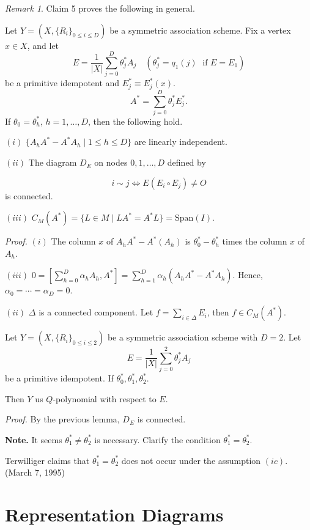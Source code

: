 \documentclass[
]{book}
\theoremstyle{definition}
\theoremstyle{definition}
\theoremstyle{definition}
\theoremstyle{definition}
\theoremstyle{remark}
\newtheorem*{remark}{Remark}
\begin{document}
\begin{remark}
Claim 5 proves the following in general.

Let \(Y = (X, \{R_i\}_{0\leq i\leq D})\) be a symmetric association scheme. Fix a vertex \(x\in X\), and let
\[E = \frac{1}{|X|}\sum_{j=0}^D \theta^*_j A_j \quad (\theta^*_j = q_1(j) \; \text{ if $E = E_1$})\]
be a primitive idempotent and \(E^*_j\equiv E^*_j(x)\).
\[A^* = \sum_{j=0}^D \theta_j^*E^*_j.\]
If \(\theta_0 = \theta^*_h\), \(h=1, \ldots, D\), then the following hold.

\((i)\) \(\{A_hA^* - A^*A_h \mid 1\leq h\leq D\}\) are linearly independent.

\((ii)\) The diagram \(D_E\) on nodes \(0, 1, \ldots, D\) defined by

\[i\sim j \Leftrightarrow E(E_i\circ E_j)\neq O\]
is connected.

\((iii)\) \(C_M(A^*) = \{L\in M\mid LA^* = A^*L\} = \mathrm{Span}(I).\)

\emph{Proof.}
\textbar{} \((i)\) The column \(x\) of \(A_hA^* - A^*(A_h)\) is \(\theta^*_0-\theta^*_h\) times the column \(x\) of \(A_h\).

\((iii)\) \({\displaystyle 0 = [\sum_{h=0}^D\alpha_hA_h, A^*] = \sum_{h=1}^D\alpha_h(A_hA^*-A^*A_h)}\). Hence, \(\alpha_0 = \cdots =\alpha_D = 0\).

\((ii)\) \(\Delta\) is a connected component. Let \(f = \sum_{i\in \Delta}E_i\), then \(f\in C_M(A^*)\).

Let \(Y = (X, \{R_i\}_{0\leq i\leq 2})\) be a symmetric association scheme with \(D = 2\). Let
\[E = \frac{1}{|X|}\sum_{j=0}^2\theta^*_j A_j\]
be a primitive idempotent. If \(\theta^*_0, \theta_1^*, \theta^*_2\).

Then \(Y\) us \(Q\)-polynomial with respect to \(E\).

\emph{Proof.}
By the previous lemma, \(D_E\) is connected.

\textbf{Note.}
It seems \(\theta^*_1 \neq \theta^*_2\) is necessary. Clarify the condition \(\theta^*_1 = \theta^*_2\).

Terwilliger claims that \(\theta^*_1 = \theta^*_2\) does not occur under the assumption \((ic)\). (March 7, 1995)
\end{remark}

\hypertarget{lec26}{%
\chapter{Representation Diagrams}\label{lec26}}
\end{document}
